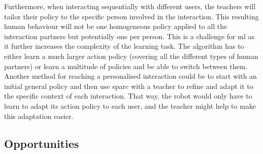 Furthermore, when interacting sequentially with different users, the teachers will tailor their policy to the specific person involved in the interaction. This resulting human behaviour will not be one homogeneous policy applied to all the interaction partners but potentially one per person. 
This is a challenge for \gls{ml} as it further increases the complexity of the learning task. The algorithm has to either learn a much larger action policy (covering all the different types of human partners) or learn a multitude of policies and be able to switch between them. Another method for reaching a personalised interaction could be to start with an initial general policy and then use \gls{sparc} with a teacher to refine and adapt it to the specific context of each interaction. That way, the robot would only have to learn to adapt its action policy to each user, and the teacher might help to make this adaptation easier.

\subsection{Opportunities} \label{sec:tutoring_opportunities}

